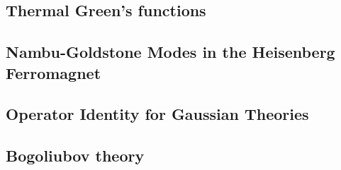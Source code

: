 % 
% 
% 



\newpage
\setcounter{section}{5}
\setcounter{subsection}{0}
\subsection{Thermal Green’s functions}

\subsection{Nambu-Goldstone Modes in the Heisenberg Ferromagnet}



\newpage
\setcounter{section}{6}
\setcounter{subsection}{0}
\subsection{Operator Identity for Gaussian Theories}


\newpage
\subsection{Bogoliubov theory}







\newpage
\setcounter{section}{7}
\setcounter{subsection}{0}
